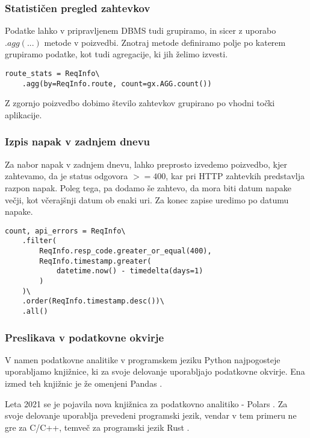 \documentclass[a4paper,12pt,openright]{book}
\begin{document}
    \newpage
    \subsubsection{Statističen pregled zahtevkov}

    Podatke lahko v pripravljenem DBMS tudi grupiramo, in sicer z uporabo $.agg(...)$ metode v poizvedbi. Znotraj metode definiramo polje po katerem grupiramo podatke, kot tudi agregacije, ki jih želimo izvesti.
    
\begin{verbatim}
route_stats = ReqInfo\
    .agg(by=ReqInfo.route, count=gx.AGG.count())
\end{verbatim}

    \noindent
    Z zgornjo poizvedbo dobimo število zahtevkov grupirano po vhodni točki aplikacije. 

    \subsubsection{Izpis napak v zadnjem dnevu}

    Za nabor napak v zadnjem dnevu, lahko preprosto izvedemo poizvedbo, kjer zahtevamo, da je status odgovora $>= 400$, kar pri HTTP zahtevkih predstavlja razpon napak. Poleg tega, pa dodamo še zahtevo, da mora biti datum napake večji, kot včerajšnji datum ob enaki uri. Za konec zapise uredimo po datumu napake.
    
\begin{verbatim}
count, api_errors = ReqInfo\
    .filter(
        ReqInfo.resp_code.greater_or_equal(400),
        ReqInfo.timestamp.greater(
            datetime.now() - timedelta(days=1)
        )
    )\
    .order(ReqInfo.timestamp.desc())\
    .all()
\end{verbatim}

    \subsubsection{Preslikava v podatkovne okvirje}

    V namen podatkovne analitike v programskem jeziku Python najpogosteje uporabljamo knjižnice, ki za svoje delovanje uporabljajo podatkovne okvirje. Ena izmed teh knjižnic je že omenjeni Pandas \cite{PANDAS_GITHUB}.
    
    Leta 2021 se je pojavila nova knjižnica za podatkovno analitiko - Polars \cite{POLARS}. Za svoje delovanje uporablja prevedeni programski jezik, vendar v tem primeru ne gre za C/C++, temveč za programski jezik Rust \cite{RUST}.
\end{document}
